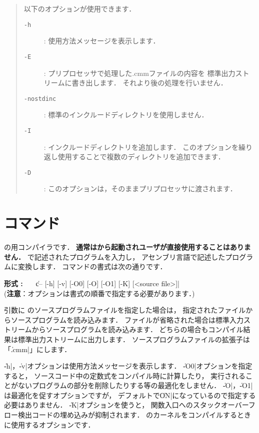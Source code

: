 \begin{quote}
\hspace{-1em}以下のオプションが使用できます．

\begin{description}
\item[{\tt -h}] : 使用方法メッセージを表示します．
\item[{\tt -E}] : プリプロセッサで処理した{.cmm}ファイルの内容を
標準出力ストリームに書き出します．
それより後の処理を行いません．
\item[{\tt -nostdinc}] : 標準のインクルードディレクトリを使用しません．
\item[{\tt -I}] : インクルードディレクトリを追加します．
このオプションを繰り返し使用することで複数のディレクトリを追加できます．
\item[{\tt -D}] : このオプションは，そのままプリプロセッサに渡されます．
\end{description}
\end{quote}

\section{{\cmmc}コマンド}
\label{command:cmmc}

{\cmml}の{\tac}用コンパイラです．
{\bf 通常は{\cme}から起動されユーザが直接使用することはありません．}
\cmml で記述されたプログラムを入力し，
\tac アセンブリ言語で記述したプログラムに変換します．
\cmmc コマンドの書式は次の通りです．

\begin{flushleft}
{\bf 形式 : }~~~\|c-- [-h] [-v] [-O0] [-O] [-O1] [-K] [<source file>]|\\
({\bf 注意}：オプションは書式の順番で指定する必要があります．)
\end{flushleft}

引数に \cmml のソースプログラムファイルを指定した場合は，
指定されたファイルからソースプログラムを読み込みます．
ファイルが省略された場合は標準入力ストリームからソースプログラムを読み込みます．
どちらの場合もコンパイル結果は標準出力ストリームに出力します．
ソースプログラムファイルの拡張子は「\|.cmm|」にします．

\|-h|，\|-v|オプションは使用方法メッセージを表示します．
\|-O0|オプションを指定すると，
ソースコード中の定数式をコンパイル時に計算したり，
実行されることがないプログラムの部分を削除したりする等の最適化をしません．
\|-O|，\|-O1|は最適化を促すオプションですが，
デフォルトで\|ON|になっているので指定する必要はありません．
\|-K|オプションを使うと，
関数入口へのスタックオーバーフロー検出コードの埋め込みが抑制されます．
\tacos のカーネルをコンパイルするときに使用するオプションです．

